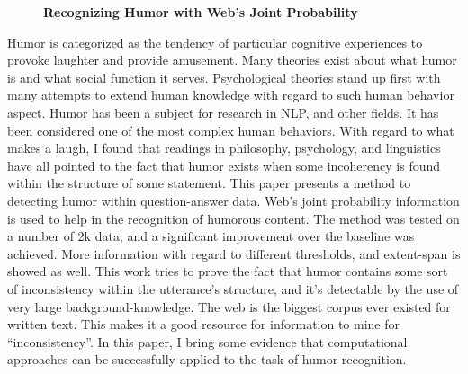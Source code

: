 \documentclass[10pt, a4paper, twopage, headinclude, footinclude, BCOR5mm]{book}
\begin{document}
\newpage

\begin{figure}[t!]
\centering
\large\textbf{Recognizing Humor with Web's Joint Probability}
\vspace*{0.5cm}
\end{figure}


\begin{table}[t!]
\end{table} 
\noindent
Humor is categorized as the tendency of particular cognitive experiences to provoke laughter and provide amusement. Many theories exist about what humor is and what social function it serves. Psychological theories stand up first with many attempts to extend human knowledge with regard to such human behavior aspect. Humor has been a subject for research in NLP, and other fields. It has been considered one of the most complex human behaviors. With regard to what makes a laugh, I found that readings in philosophy, psychology, and linguistics have all pointed to the fact that humor exists when some incoherency is found within the structure of some statement.  This paper presents a method to detecting humor within question-answer data. Web's joint probability information is used to help in the recognition of humorous content. The method was tested on a number of 2k data, and a significant improvement over the baseline was achieved. More information with regard to different thresholds, and extent-span is showed as well. This work tries to prove the fact that humor contains some sort of inconsistency within the utterance's structure, and it's detectable by the use of very large background-knowledge. The web is the biggest corpus ever existed for written text. This makes it a good resource for information to mine for “inconsistency”. In this paper, I bring some evidence that computational approaches can be successfully applied to the task of humor recognition.  
\end{document}
